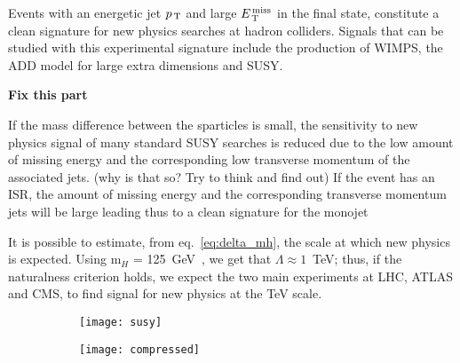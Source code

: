 Events with an energetic jet $p_\mathrm{\, T}$ and large $E_\mathrm{\, T}^\mathrm{\, miss}$ in the final state, constitute a
clean signature for new physics searches at hadron colliders. Signals that can
be studied with this experimental signature include the production of WIMPS,
the ADD model for large extra dimensions and SUSY.

\mbox{}

\noindent \textbf{Fix this part}

If the mass difference between the sparticles is small, the sensitivity to new
physics signal of many standard SUSY searches is reduced due to the low amount
of missing energy and the corresponding low transverse momentum of the
associated jets. (why is that so? Try to think and find out) If the event has an
ISR, the amount of missing energy and the corresponding transverse momentum jets
will be large leading thus to a clean signature for the monojet

\mbox{}

It is possible to estimate, from eq.~\eqref{eq:delta_mh}, the scale at which new
physics is expected. Using m$_H$ = 125~GeV~\cite{PDG}, we get that
$\Lambda \approx 1$~TeV; thus, if the naturalness criterion holds, we expect the
two main experiments at LHC, ATLAS and CMS, to find signal for new physics at
the TeV scale.

\begin{figure}[!h]
  \centering
  \begin{subfigure}[t]{.48\linewidth}
    \texttt{[image: susy]}
    \caption{}
    \label{fig:susy}
  \end{subfigure}
  \begin{subfigure}[t]{.48\linewidth}
    \texttt{[image: compressed]}
    \caption{}
    \label{fig:compressed}
  \end{subfigure}
  \caption{}
  \label{fig:motivation}
\end{figure}
